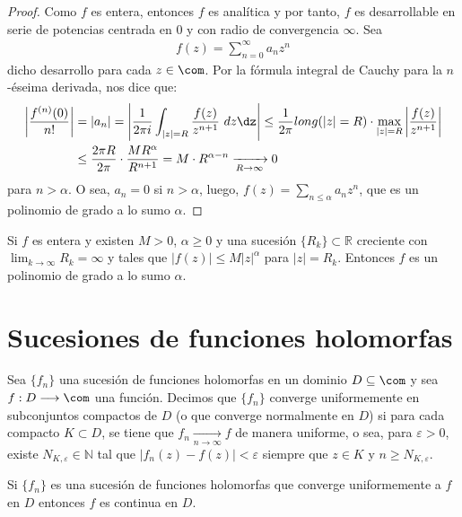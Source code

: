 \begin{proof}
Como $f$ es entera, entonces $f$ es analítica y por tanto, $f$ es desarrollable en serie de potencias centrada en 0 y con radio de convergencia $\infty$. Sea
\begin{align*}
   f(z) = \sum_{n=0}^{\infty}{a_nz^n} 
\end{align*}
dicho desarrollo para cada $z \in \com$. Por la fórmula integral de Cauchy para la $n$-éseima derivada, nos dice que:
\begin{align*}
   \left| \frac{f^{(n)}(0)}{n!} \right| &= |a_n| = \left| \frac{1}{2\pi i}\int_{|z| = R}{\frac{f(z)}{z^{n+1}} \ dz}  \dz\right| \leq \frac{1}{2\pi}long(|z| = R) \cdot \max_{|z| = R} \left| \frac{f(z)}{z^{n+1}} \right| \\
   &\leq \frac{2\pi R}{2\pi} \cdot \frac{MR^{\alpha}}{R^{n +1}} = M \cdot R^{\alpha - n} \xrightarrow[R \to \infty]{} 0
\end{align*}
 para $n > \alpha$. O sea, $a_n = 0$ si $n > \alpha$, luego, $f(z) = \sum_{n\leq \alpha}{a_nz^n}$, que es un polinomio de grado a lo sumo $\alpha$.
\end{proof}

\begin{teo}[de Liouville]
Si $f$ es entera y existen $M > 0$, $\alpha \ge 0$ y una sucesión $\{R_k\} \subset \mathbb{R}$ creciente con $\lim_{k \to \infty}{R_k} = \infty$ y tales que $|f(z)| \leq M|z|^{\alpha}$ para $|z| = R_k$. Entonces $f$ es un polinomio de grado a lo sumo $\alpha$.
\end{teo}

\section{Sucesiones de funciones holomorfas}

\begin{defi}
Sea $\{f_n\}$ una sucesión de funciones holomorfas en un dominio $D \subseteq \com$ y sea $f: D \longrightarrow \com$ una función. Decimos que $\{f_n\}$ converge uniformemente en subconjuntos compactos de $D$ (o que converge normalmente en $D$) si para cada compacto $K \subset D$, se tiene que $f_n \xrightarrow[n \to \infty]{} f$ de manera uniforme, o sea, para $\varepsilon > 0$, existe $N_{K,\varepsilon} \in \mathbb{N}$ tal que $|f_n(z) - f(z)| < \varepsilon$ siempre que $z \in K$ y $n \ge N_{K,\varepsilon}$. 
\end{defi}

\begin{obs}
Si $\{f_n\}$ es una sucesión de funciones holomorfas que converge uniformemente a $f$ en $D$ entonces $f$ es continua en $D$.
\end{obs}


